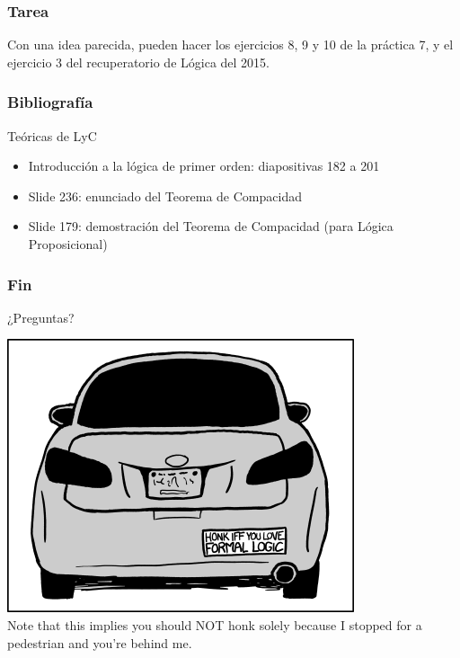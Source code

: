 \documentclass{beamer}
\begin{document}
\begin{frame}
\frametitle{Tarea}
Con una idea parecida, pueden hacer los ejercicios 8, 9 y 10 de la práctica 7, y el ejercicio 3 del recuperatorio de Lógica del 2015.
\end{frame}

\begin{frame}
\frametitle{Bibliografía}

Teóricas de LyC
\begin{itemize}
	\item Introducción a la lógica de primer orden: diapositivas 182 a 201
	\item Slide 236: enunciado del Teorema de Compacidad
	\item Slide 179: demostración del Teorema de Compacidad (para Lógica Proposicional)
	
\end{itemize}

\end{frame}


\begin{frame}
\frametitle{Fin}

\huge{¿Preguntas?} \bigskip


\includegraphics[scale=0.5]{formal_logic.png}
\\
\small{Note that this implies you should NOT honk solely because I stopped for a pedestrian and you're behind me.}

\end{frame}



%
%
%
%



\end{document}

